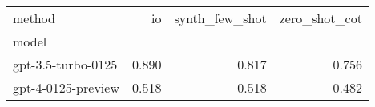 \begin{tabular}{lrrr}
\toprule
method & io & synth_few_shot & zero_shot_cot \\
model &  &  &  \\
\midrule
gpt-3.5-turbo-0125 & 0.890 & 0.817 & 0.756 \\
gpt-4-0125-preview & 0.518 & 0.518 & 0.482 \\
\bottomrule
\end{tabular}
